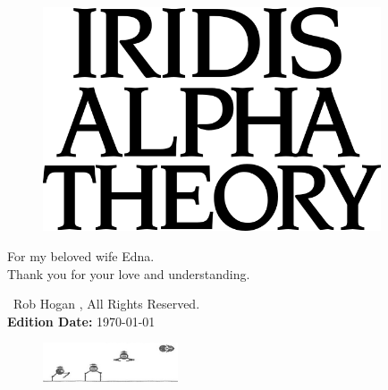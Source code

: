 
\vspace*{\fill}
\begin{figure}[H]
    \centering
      \includegraphics[width=10cm]{src/cover/title_page.png}%
\end{figure}
\vspace*{\fill}
\thispagestyle{empty}%

\clearpage

\vspace*{\fill}
For my beloved wife Edna.\\
Thank you for your love and understanding.\\
\bigskip
\vspace*{\fill}

\begin{minipage}[b]{0.48\linewidth}
\textcopyright\ Rob Hogan \the\year{}, All Rights Reserved. \\
\textbf{Edition Date:} \today
\end{minipage}
\begin{minipage}[b]{0.48\linewidth}
\begin{figure}[H]
    \centering
      \includegraphics[width=4cm]{src/bumph/sketch.png}%
\
\end{figure}
\end{minipage}

\doclicenseThis
\thispagestyle{empty}%
\clearpage
